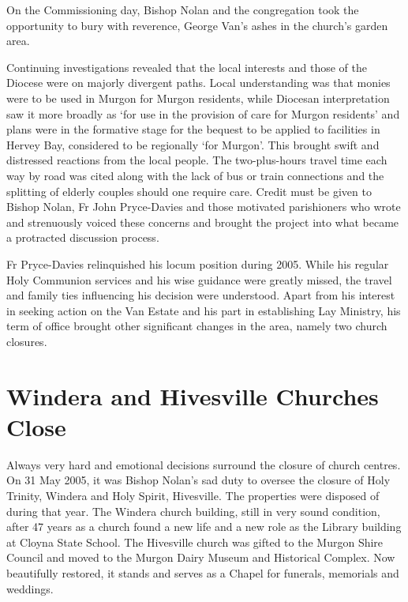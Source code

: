 On the Commissioning day, Bishop Nolan and the congregation took the opportunity to bury with reverence, George Van's ashes in the church's garden area.



Continuing investigations revealed that the local interests and those of the Diocese were on majorly divergent paths. Local understanding was that monies were to be used in Murgon for Murgon residents, while Diocesan interpretation saw it more broadly as `for use in the provision of care for Murgon residents' and plans were in the formative stage for the bequest to be applied to facilities in Hervey Bay, considered to be regionally `for Murgon'. This brought swift and distressed reactions from the local people. The two-plus-hours travel time each way by road was cited along with the lack of bus or train connections and the splitting of elderly couples should one require care. Credit must be given to Bishop Nolan, Fr John Pryce-Davies and those motivated parishioners who wrote and strenuously voiced these concerns and brought the project into what became a protracted discussion process.



Fr Pryce-Davies relinquished his locum position during 2005. While his regular Holy Communion services and his wise guidance were greatly missed, the travel and family ties influencing his decision were understood. Apart from his interest in seeking action on the Van Estate and his part in establishing Lay Ministry, his term of office brought other significant changes in the area, namely two church closures.



\section{Windera and Hivesville Churches Close}



Always very hard and emotional decisions surround the closure of church centres. On 31 May 2005, it was Bishop Nolan's sad duty to oversee the closure of Holy Trinity, Windera and Holy Spirit, Hivesville. The properties were disposed of during that year. The Windera church building, still in very sound condition, after 47 years as a church found a new life and a new role as the Library building at Cloyna State School. The Hivesville church was gifted to the Murgon Shire Council and moved to the Murgon Dairy Museum and Historical Complex. Now beautifully restored, it stands and serves as a Chapel for funerals, memorials and weddings.



